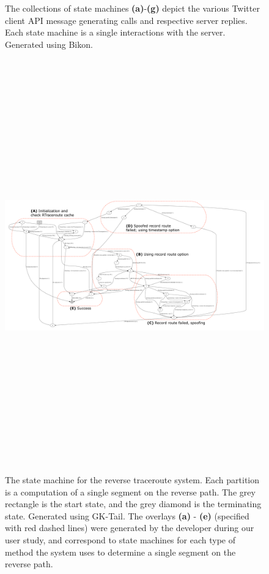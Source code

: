 \begin{figure}

\caption{The collections of state machines \textbf{(a)}-\textbf{(g)}
  depict the various Twitter client API message generating calls and
  respective server replies. Each state machine is a single
  interactions with the server. Generated using Bikon.}
\label{fig:twitter_api}
\end{figure}

\newpage

\begin{figure}
\includegraphics[width=10in,height=7in]{img/multiple_traces_scalable_gktail_labeled.pdf}
\caption{The state machine for the reverse traceroute system. Each
  partition is a computation of a single segment on the reverse path.
  The grey rectangle is the start state, and the grey diamond is the
  terminating state. Generated using GK-Tail. The overlays
  \textbf{(a)} - \textbf{(e)} (specified with red dashed lines) were
  generated by the developer during our user study, and correspond to
  state machines for each type of method the system uses to determine
  a single segment on the reverse path.}
  \label{fig:rt_multiple_traces_scalable_gktail}
\end{figure}

